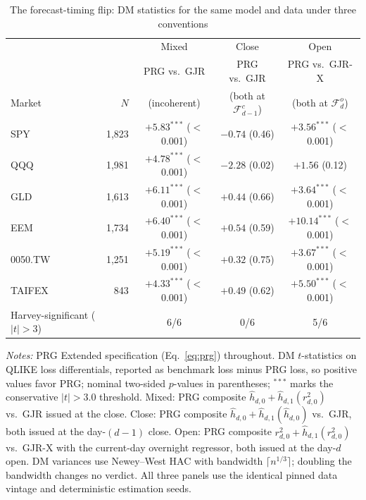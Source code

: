 \documentclass[11pt,a4paper]{article}
\begin{document}
\begin{table}[htbp]
\centering
\caption{The forecast-timing flip: DM statistics for the same model and data under three conventions}
\label{tab:flip}
\small
\begin{tabular}{lrccc}
\toprule
 & & Mixed & Close & Open \\
 & & PRG vs.\ GJR & PRG vs.\ GJR & PRG vs.\ GJR-X \\
Market & $N$ & (incoherent) & (both at $\mathcal{F}^{c}_{d-1}$) & (both at $\mathcal{F}^{o}_{d}$) \\
\midrule
SPY     & 1,823 & $+5.83^{***}$ ($<$0.001) & $-0.74$ (0.46) & $+3.56^{***}$ ($<$0.001) \\
QQQ     & 1,981 & $+4.78^{***}$ ($<$0.001) & $-2.28$ (0.02) & $+1.56$ (0.12) \\
GLD     & 1,613 & $+6.11^{***}$ ($<$0.001) & $+0.44$ (0.66) & $+3.64^{***}$ ($<$0.001) \\
EEM     & 1,734 & $+6.40^{***}$ ($<$0.001) & $+0.54$ (0.59) & $+10.14^{***}$ ($<$0.001) \\
0050.TW & 1,251 & $+5.19^{***}$ ($<$0.001) & $+0.32$ (0.75) & $+3.67^{***}$ ($<$0.001) \\
TAIFEX  & 843 & $+4.33^{***}$ ($<$0.001) & $+0.49$ (0.62) & $+5.50^{***}$ ($<$0.001) \\
\midrule
Harvey-significant ($|t|>3$) & & 6/6 & 0/6 & 5/6 \\
\bottomrule
\end{tabular}
\begin{flushleft}
\footnotesize
\emph{Notes:} PRG Extended specification (Eq.~\ref{eq:prg}) throughout. DM $t$-statistics on QLIKE loss differentials, reported as benchmark loss minus PRG loss, so positive values favor PRG; nominal two-sided $p$-values in parentheses; $^{***}$ marks the conservative $|t|>3.0$ threshold. Mixed: PRG composite $\hat{h}_{d,0} + \hat{h}_{d,1}(r^2_{d,0})$ vs.\ GJR issued at the close. Close: PRG composite $\hat{h}_{d,0} + \hat{h}_{d,1}(\hat{h}_{d,0})$ vs.\ GJR, both issued at the day-$(d-1)$ close. Open: PRG composite $r^2_{d,0} + \hat{h}_{d,1}(r^2_{d,0})$ vs.\ GJR-X with the current-day overnight regressor, both issued at the day-$d$ open. DM variances use Newey--West HAC with bandwidth $\lceil n^{1/3}\rceil$; doubling the bandwidth changes no verdict. All three panels use the identical pinned data vintage and deterministic estimation seeds.
\end{flushleft}
\end{table}
\end{document}
